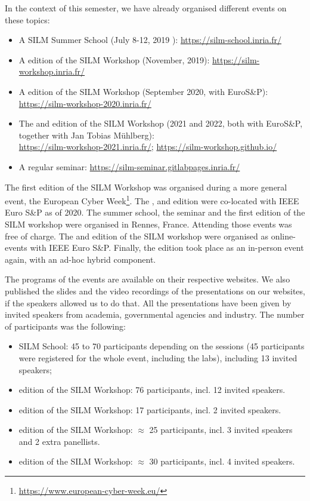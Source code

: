 \documentclass[a4paper,11pt]{article}
\begin{document}
In the context of this semester, we have already organised different events
on these topics:
%
\begin{itemize}
%
    \item A SILM Summer School (July 8-12, 2019 ):
\url{https://silm-school.inria.fr/}
%
    \item A  edition of the SILM Workshop (November, 2019):
\url{https://silm-workshop.inria.fr/}
%
    \item A  edition of the SILM Workshop (September 2020, with
EuroS\&P): \\ \url{https://silm-workshop-2020.inria.fr/}
%
    \item The  and  edition of the SILM Workshop (2021 and
2022, both with EuroS\&P, together with Jan Tobias M\"uhlberg): \\
\url{https://silm-workshop-2021.inria.fr/};
\url{https://silm-workshop.github.io/}
%
    \item A regular seminar: \url{https://silm-seminar.gitlabpages.inria.fr/}
%
\end{itemize}

The first edition of the SILM Workshop was organised during a more general
event, the European Cyber
Week\footnote{\url{https://www.european-cyber-week.eu/}}.  The ,
 and  edition were co-located with IEEE Euro S\&P as of 2020. 
% 
The summer school, the seminar and the first edition of the SILM workshop
were organised in Rennes, France. Attending those events was free of
charge. The  and  edition of the SILM workshop were organised
as online-events with IEEE Euro S\&P. Finally, the  edition took
place as an in-person event again, with an ad-hoc hybrid component.

The programs of the events are available on their respective websites. We
also published the slides and the video recordings of the presentations on
our websites, if the speakers allowed us to do that. All the presentations
have been given by invited speakers from academia, governmental agencies
and industry. The number of participants was the following:
%
\begin{itemize}
%
    \item SILM School: 45 to 70 participants depending on the sessions (45
participants were registered for the whole event, including the labs),
including 13 invited speakers;
%
    \item {} edition of the SILM Workshop: 76 participants, incl.
12 invited speakers.
%
    \item {} edition of the SILM Workshop: 17 participants, incl.
2 invited speakers.
%
    \item {} edition of the SILM Workshop: $\approx$ 25 participants,
incl. 3 invited speakers and 2 extra panellists.
%
    \item {} edition of the SILM Workshop: $\approx$ 30 participants,
incl. 4 invited speakers.
%
\end{itemize}
\end{document}

